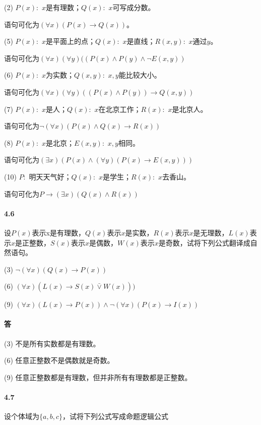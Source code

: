 \documentclass[hyperref, UTF8]{ctexart}
\begin{document}
(2) $P(x): $ $x$是有理数；$Q(x): $ $x$可写成分数。

语句可化为$ ( \forall x)(P(x) \rightarrow Q(x))$。

(5) $P(x): $ $x$是平面上的点；$Q(x): $ $x$是直线；$R(x,y): $ $x$通过$y$。

语句可化为$ ( \forall x) ( \forall y)((P(x) \land P(y) \land \lnot E(x,y))$

(6) $P(x): $ $x$为实数；$Q(x,y): $ $x,y$能比较大小。

语句可化为$ ( \forall x) ( \forall y)((P(x) \land P(y)) \rightarrow Q(x,y))$

(7) $P(x): $ $x$是人；$Q(x): $ $x$在北京工作；$R(x): $ $x$是北京人。

语句可化为$ \lnot ( \forall x)(P(x) \land Q(x) \rightarrow R(x))$

(8) $P(x):$ $x$是北京；$E(x,y): $ $x,y$相同。

语句可化为$ ( \exists x)(P(x) \land ( \forall y)(P(x) \rightarrow E(x,y)))$

(10) $P: $ 明天天气好；$Q(x): $ $x$是学生；$R(x): $ $x$去香山。

语句可化为$ P \rightarrow ( \exists x)(Q(x) \land R(x))$

\paragraph{4.6}\label{4.6}
设$P(x)$表示x是有理数，$Q(x)$表示$x$是实数，$R(x)$表示$x$是无理数，$L(x)$表示$x$是正整数，$S(x)$表示$x$是偶数，$W(x)$表示$x$是奇数，试将下列公式翻译成自然语句。

(3) $  \lnot ( \forall x )(Q(x) \rightarrow P(x)) $ 

(6) $( \forall x ) (L(x) \rightarrow S(x) \bar \lor W(x)))$ 

(9) $ ( \forall x ) (L(x) \rightarrow P(x)) \land \lnot ( \forall x) (P(x) \rightarrow I(x)) $

\paragraph{答}
(3) 不是所有实数都是有理数。

(6) 任意正整数不是偶数就是奇数。

(9) 任意正整数都是有理数，但并非所有有理数都是正整数。

\paragraph{4.7}\label{4.7}
设个体域为$  \{ a, b, c \}  $，试将下列公式写成命题逻辑公式 
\end{document}
